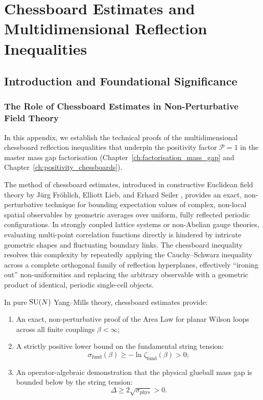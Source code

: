 \chapter{Chessboard Estimates and Multidimensional Reflection Inequalities}
\label{app:chessboard_estimates}
\label{app:chessboard}

\section{Introduction and Foundational Significance}
\label{sec:app_c_intro}

\subsection{The Role of Chessboard Estimates in Non-Perturbative Field Theory}
\label{subsec:chessboard_role}

In this appendix, we establish the technical proofs of the multidimensional chessboard reflection inequalities that underpin the positivity factor $\mathcal{P} = 1$ in the master mass gap factorisation (Chapter~\ref{ch:factorisation_mass_gap} and Chapter~\ref{ch:positivity_chessboards}).

The method of chessboard estimates, introduced in constructive Euclidean field theory by J\"urg Fr\"ohlich, Elliott Lieb, and Erhard Seiler \cite{FrohlichLieb1978, FrohlichLiebSeiler1976}, provides an exact, non-perturbative technique for bounding expectation values of complex, non-local spatial observables by geometric averages over uniform, fully reflected periodic configurations. In strongly coupled lattice systems or non-Abelian gauge theories, evaluating multi-point correlation functions directly is hindered by intricate geometric shapes and fluctuating boundary links. The chessboard inequality resolves this complexity by repeatedly applying the Cauchy--Schwarz inequality across a complete orthogonal family of reflection hyperplanes, effectively ``ironing out'' non-uniformities and replacing the arbitrary observable with a geometric product of identical, periodic single-cell objects.

In pure $\mathrm{SU}(N)$ Yang--Mills theory, chessboard estimates provide:
\begin{enumerate}
    \item An exact, non-perturbative proof of the Area Law for planar Wilson loops across all finite couplings $\beta < \infty$;
    \item A strictly positive lower bound on the fundamental string tension:
    \begin{equation}
    \sigma_{\mathrm{fund}}(\beta) \ge -\ln \zeta_{\mathrm{fund}}(\beta) > 0;
    \end{equation}
    \item An operator-algebraic demonstration that the physical glueball mass gap is bounded below by the string tension:
    \begin{equation}
    \Delta \ge 2 \sqrt{\sigma_{\mathrm{phys}}} > 0.
    \end{equation}
\end{enumerate}

